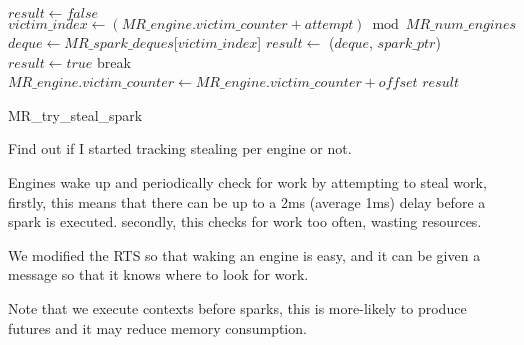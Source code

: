 \begin{algorithm}
\begin{algorithmic}[1]
  \State $result \gets false$
    \State $victim\_index \gets
        (MR\_engine.victim\_counter + attempt) \bmod MR\_num\_engines$
    \State $deque \gets
       MR\_spark\_deques$[$victim\_index$]
    \State $result \gets$ \steal($deque$, $spark\_ptr$)
      \State $result \gets true$
      \State break
    \EndIf
  \EndFor
  \State $MR\_engine.victim\_counter \gets
    MR\_engine.victim\_counter + offset$
  \State \Return $result$
\EndProcedure
\end{algorithmic}
\caption{MR\_try\_steal\_spark}
\label{alg:try_steal_spark_initial}
\end{algorithm}

Find out if I started tracking stealing per engine or not.

Engines wake up and periodically check for work by attempting to
steal work,
firstly, this means that there can be up to a 2ms (average 1ms) delay before
a spark is executed.
secondly, this checks for work too often, wasting resources.

We modified the RTS so that waking an engine is easy, and it can be given a
message so that it knows where to look for work.


Note that we execute contexts before sparks,
this is more-likely to produce futures and it may reduce memory consumption.








